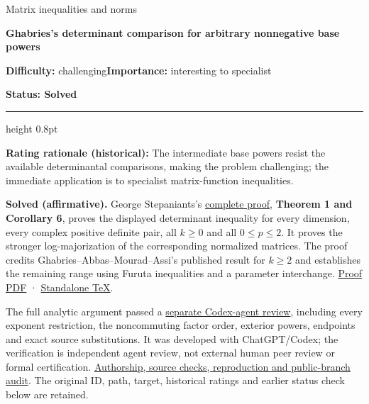 \documentclass[11pt,a4paper]{article}
\makeatletter
\renewcommand{\subsection}{\Needspace{4\baselineskip}\@startsection{subsection}{2}{0pt}{9pt plus 1pt minus 1pt}{3pt}{\sffamily\bfseries\normalsize\color{ink}}}
\makeatother
\begin{document}
{\sffamily\small\color{muted}Matrix inequalities and norms\par}
\vspace{3pt}
{\raggedright{}\sffamily\bfseries\fontsize{21}{24}\selectfont\color{ink}Ghabries's
determinant comparison for arbitrary nonnegative base powers\par}
\vspace{7pt}
{\sffamily\small\textbf{Difficulty:} challenging\quad\textbf{Importance:} interesting
to specialist\par}
{\sffamily\small\bfseries\color{accent}Status: Solved\par}
\vspace{4pt}
{\color{accent}\hrule height 0.8pt}
\vspace{6pt}
\textbf{Rating rationale (historical):} The intermediate base powers
resist the available determinantal comparisons, making the problem
challenging; the immediate application is to specialist matrix-function
inequalities.

\subsection{Resolution --- 2026-09-11}\label{resolution-2026-09-11}

\textbf{Solved (affirmative).} George Stepaniants's
\href{https://github.com/ajt60gaibb/OpenProblemsInNLA/blob/main/matrix-inequalities-and-norms/MI-28/solution.md}{complete
proof}, \textbf{Theorem 1 and Corollary 6}, proves the displayed
determinant inequality for every dimension, every complex positive
definite pair, all \(k\ge0\) and all \(0\le p\le2\). It proves the
stronger log-majorization of the corresponding normalized matrices. The
proof credits Ghabries--Abbas--Mourad--Assi's published result for
\(k\ge2\) and establishes the remaining range using Furuta inequalities
and a parameter interchange.
\href{https://github.com/ajt60gaibb/OpenProblemsInNLA/blob/main/matrix-inequalities-and-norms/MI-28/solution.pdf}{Proof
PDF} ·
\href{https://github.com/ajt60gaibb/OpenProblemsInNLA/blob/main/matrix-inequalities-and-norms/MI-28/solution.tex}{Standalone
TeX}.

The full analytic argument passed a
\href{https://github.com/ajt60gaibb/OpenProblemsInNLA/blob/main/references/stepaniants-mi28-2026-09-11/verification/reviews/MI-28-review.md}{separate
Codex-agent review}, including every exponent restriction, the
noncommuting factor order, exterior powers, endpoints and exact source
substitutions. It was developed with ChatGPT/Codex; the verification is
independent agent review, not external human peer review or formal
certification.
\href{https://github.com/ajt60gaibb/OpenProblemsInNLA/blob/main/references/stepaniants-mi28-2026-09-11/README.md}{Authorship,
source checks, reproduction and public-branch audit}. The original ID,
path, target, historical ratings and earlier status check below are
retained.
\end{document}
